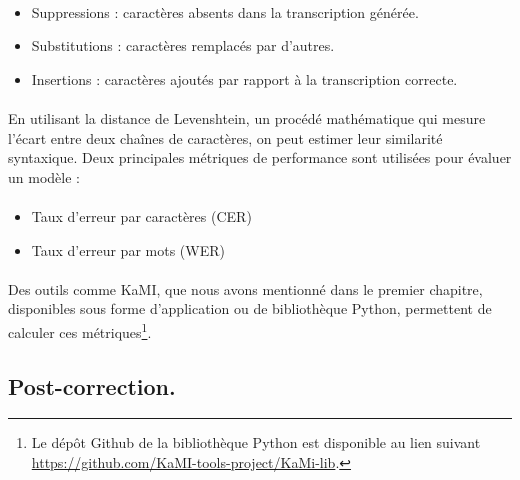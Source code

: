 \documentclass[a4paper,12pt,twoside]{book}
\begin{document}
\paragraph{}
\begin{itemize}
	\item Suppressions : caractères absents dans la transcription générée.
	\item Substitutions : caractères remplacés par d'autres.
	\item Insertions : caractères ajoutés par rapport à la transcription correcte.
\end{itemize}

\paragraph{}
En utilisant la distance de Levenshtein, un procédé mathématique qui mesure l'écart entre deux chaînes de caractères, on peut estimer leur similarité syntaxique. Deux principales métriques de performance sont utilisées pour évaluer un modèle :

\paragraph{}
\begin{itemize}
	\item Taux d'erreur par caractères (CER)
	\item Taux d'erreur par mots (WER)
\end{itemize}

\paragraph{}
Des outils comme KaMI, que nous avons mentionné dans le premier chapitre, disponibles sous forme d'application ou de bibliothèque Python, permettent de calculer ces métriques\footnote{Le dépôt Github de la bibliothèque Python est disponible au lien suivant \url{https://github.com/KaMI-tools-project/KaMi-lib}.}.

\subsection{Post-correction.}
\end{document}
